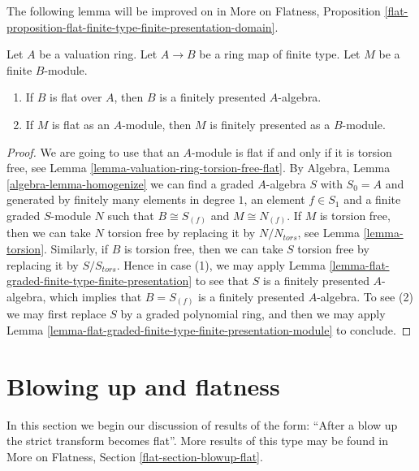 \noindent
The following lemma will be improved on in
More on Flatness, Proposition
\ref{flat-proposition-flat-finite-type-finite-presentation-domain}.

\begin{lemma}
\label{lemma-flat-finite-type-valuation-ring-finite-presentation}
Let $A$ be a valuation ring. Let $A \to B$ be a ring map of finite type.
Let $M$ be a finite $B$-module.
\begin{enumerate}
\item If $B$ is flat over $A$, then $B$ is a finitely presented $A$-algebra.
\item If $M$ is flat as an $A$-module, then $M$ is finitely presented
as a $B$-module.
\end{enumerate}
\end{lemma}

\begin{proof}
We are going to use that an $A$-module is flat if and only if it is
torsion free, see
Lemma \ref{lemma-valuation-ring-torsion-free-flat}.
By
Algebra, Lemma \ref{algebra-lemma-homogenize}
we can find a graded $A$-algebra $S$ with $S_0 = A$ and generated
by finitely many elements in degree $1$, an element $f \in S_1$ and a
finite graded $S$-module $N$ such that $B \cong S_{(f)}$ and
$M \cong N_{(f)}$. If $M$ is torsion free, then we can take $N$ torsion
free by replacing it by $N/N_{tors}$, see
Lemma \ref{lemma-torsion}.
Similarly, if $B$ is torsion free, then we can take
$S$ torsion free by replacing it by $S/S_{tors}$.
Hence in case (1), we may apply
Lemma \ref{lemma-flat-graded-finite-type-finite-presentation}
to see that $S$ is a finitely presented
$A$-algebra, which implies that $B = S_{(f)}$ is a finitely
presented $A$-algebra. To see (2) we may first replace $S$ by
a graded polynomial ring, and then we may apply
Lemma \ref{lemma-flat-graded-finite-type-finite-presentation-module}
to conclude.
\end{proof}






\section{Blowing up and flatness}
\label{section-blowup-flat}

\noindent
In this section we begin our discussion of results of the form: ``After a
blow up the strict transform becomes flat''. More results of this type may
be found in More on Flatness, Section \ref{flat-section-blowup-flat}.

